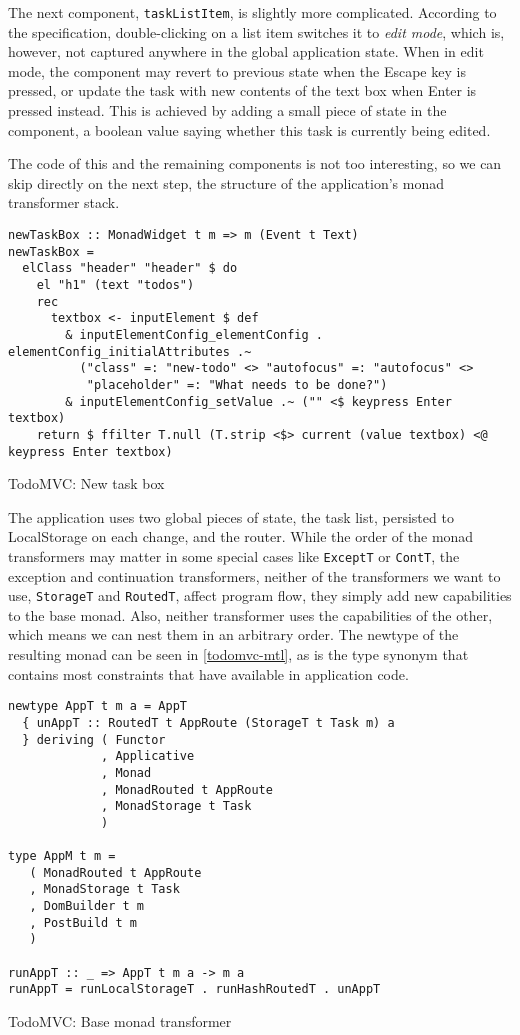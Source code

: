 \documentclass[english,odsaz]{fitthesis}
\begin{document}
The next component, \texttt{taskListItem}, is slightly more complicated. According to the
specification, double-clicking on a list item switches it to \emph{edit mode}, which is,
however, not captured anywhere in the global application state. When in edit
mode, the component may revert to previous state when the Escape key is pressed,
or update the task with new contents of the text box when Enter is pressed
instead. This is achieved by adding a small piece of state in the component, a
boolean value saying whether this task is currently being edited.

The code of this and the remaining components is not too interesting, so we can
skip directly on the next step, the structure of the application's monad
transformer stack.

\begin{listing}[htbp]
\begin{verbatim}
newTaskBox :: MonadWidget t m => m (Event t Text)
newTaskBox =
  elClass "header" "header" $ do
    el "h1" (text "todos")
    rec
      textbox <- inputElement $ def
        & inputElementConfig_elementConfig . elementConfig_initialAttributes .~
          ("class" =: "new-todo" <> "autofocus" =: "autofocus" <>
           "placeholder" =: "What needs to be done?")
        & inputElementConfig_setValue .~ ("" <$ keypress Enter textbox)
    return $ ffilter T.null (T.strip <$> current (value textbox) <@ keypress Enter textbox)
\end{verbatim}
\caption{TodoMVC: New task box \label{new-task-box}}
\end{listing}

The application uses two global pieces of state, the task list, persisted to
LocalStorage on each change, and the router. While the order of the monad
transformers may matter in some special cases like \texttt{ExceptT} or \texttt{ContT}, the
exception and continuation transformers, neither of the transformers we want to
use, \texttt{StorageT} and \texttt{RoutedT}, affect program flow, they simply add new capabilities
to the base monad. Also, neither transformer uses the capabilities of the other,
which means we can nest them in an arbitrary order. The newtype of the resulting
monad can be seen in \ref{todomvc-mtl}, as is the type synonym that contains most
constraints that have available in application code.

\begin{listing}[htbp]
\begin{verbatim}
newtype AppT t m a = AppT
  { unAppT :: RoutedT t AppRoute (StorageT t Task m) a
  } deriving ( Functor
             , Applicative
             , Monad
             , MonadRouted t AppRoute
             , MonadStorage t Task
             )

type AppM t m =
   ( MonadRouted t AppRoute
   , MonadStorage t Task
   , DomBuilder t m
   , PostBuild t m
   )

runAppT :: _ => AppT t m a -> m a
runAppT = runLocalStorageT . runHashRoutedT . unAppT
\end{verbatim}
\caption{TodoMVC: Base monad transformer \label{todomvc-mtl}}
\end{listing}
\end{document}
